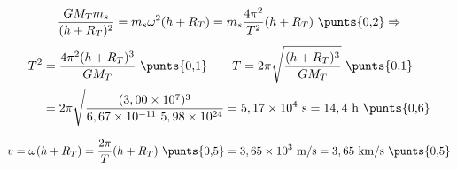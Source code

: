 \begin{solapartat}
\[ \frac{GM_Tm_s}{(h+R_T)^2} = m_s\omega^2(h+R_T) = m_s\frac{4\pi^2}{T^2}(h+R_T)\ \text{\punts{0,2}} \Rightarrow \]
\begin{align*}
T^2 &= \frac{4\pi^2(h+R_T)^3}{GM_T}\ \text{\punts{0,1}} \qquad T = 2\pi\sqrt{\frac{(h+R_T)^3}{GM_T}}\ \text{\punts{0,1}}\\
&= 2\pi\sqrt{\frac{(3,00\times 10^{7})^3}{6,67\times 10^{-11}\ 5,98\times 10^{24}}} = 5,17\times 10^{4}\ \mathrm{s} = 14,4\ \mathrm{h}\ \text{\punts{0,6}}
\end{align*}
\end{solapartat}

\begin{solapartat}
\[ v = \omega(h+R_T) = \frac{2\pi}{T}(h+R_T)\ \text{\punts{0,5}} = 3,65\times 10^{3}\ \mathrm{m/s} = 3,65\ \mathrm{km/s}\ \text{\punts{0,5}} \]
\end{solapartat}
